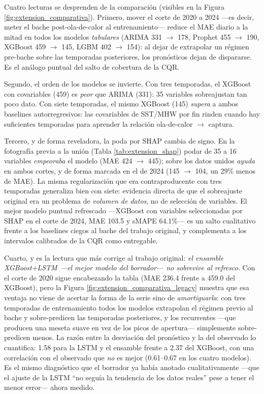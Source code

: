 Cuatro lecturas se desprenden de la comparación (visibles en la Figura \ref{fig:extension_comparativa}). Primero, mover el corte de 2020 a 2024 ---es decir, meter el bache post-ola-de-calor al entrenamiento--- reduce el MAE diario a la mitad en todos los modelos \emph{tabulares} (ARIMA 331 $\to$ 178, Prophet 455 $\to$ 190, XGBoost 459 $\to$ 145, LGBM 402 $\to$ 154): al dejar de extrapolar un régimen pre-bache sobre las temporadas posteriores, los pronósticos dejan de dispararse. Es el análogo puntual del salto de cobertura de la CQR.

Segundo, el orden de los modelos se invierte. Con tres temporadas, el XGBoost con covariables (459) es \emph{peor} que ARIMA (331): 35 variables sobreajustan tan poco dato. Con siete temporadas, el mismo XGBoost (145) \emph{supera} a ambos baselines autorregresivos: las covariables de SST/MHW por fin rinden cuando hay suficientes temporadas para aprender la relación ola-de-calor $\to$ captura.

Tercero, y de forma reveladora, la poda por SHAP cambia de signo. En la fotografía previa a la unión (Tabla \ref{tab:extension_shap}) podar de 35 a 16 variables \emph{empeoraba} el modelo (MAE 424 $\to$ 445); sobre los datos unidos \emph{ayuda} en ambos cortes, y de forma marcada en el de 2024 (145 $\to$ 104, un 29\% menos de MAE). La misma regularización que era contraproducente con tres temporadas generaliza bien con siete: evidencia directa de que el sobreajuste original era un problema de \emph{volumen de datos}, no de selección de variables. El mejor modelo puntual refrescado ---XGBoost con variables seleccionadas por SHAP en el corte de 2024, MAE 103.5 y sMAPE 64.1\%--- es un salto cualitativo frente a los baselines ciegos al bache del trabajo original, y complementa a los intervalos calibrados de la CQR como entregable.

Cuarto, y es la lectura que más corrige al trabajo original: \emph{el ensamble XGBoost+LSTM ---el mejor modelo del borrador--- no sobrevive al refresco}. Con el corte de 2020 sigue encabezando la tabla (MAE 236.4 frente a 459.0 del XGBoost), pero la Figura \ref{fig:extension_comparativa_legacy} muestra que esa ventaja no viene de acertar la forma de la serie sino de \emph{amortiguarla}: con tres temporadas de entrenamiento todos los modelos extrapolan el régimen previo al bache y sobre-predicen las temporadas posteriores, y los recurrentes ---que producen una meseta suave en vez de los picos de apertura--- simplemente sobre-predicen menos. La razón entre la desviación del pronóstico y la del observado lo cuantifica: 1.58 para la LSTM y el ensamble frente a 2.37 del XGBoost, con una correlación con el observado que \emph{no} es mejor (0.61--0.67 en los cuatro modelos). Es el mismo diagnóstico que el borrador ya había anotado cualitativamente ---que el ajuste de la LSTM ``no seguía la tendencia de los datos reales'' pese a tener el menor error--- ahora medido.

